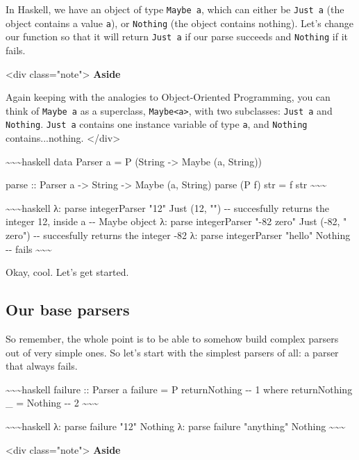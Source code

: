 \documentclass[]{article}
\begin{document}
In Haskell, we have an object of type \texttt{Maybe\ a}, which can either be
\texttt{Just\ a} (the object contains a value \texttt{a}), or \texttt{Nothing}
(the object contains nothing). Let's change our function so that it will return
\texttt{Just\ a} if our parse succeeds and \texttt{Nothing} if it fails.

\textless{}div class="note"\textgreater{} \textbf{Aside}

Again keeping with the analogies to Object-Oriented Programming, you can think
of \texttt{Maybe\ a} as a superclass, \texttt{Maybe\textless{}a\textgreater{}},
with two subclasses: \texttt{Just\ a} and \texttt{Nothing}. \texttt{Just\ a}
contains one instance variable of type \texttt{a}, and \texttt{Nothing}
contains...nothing. \textless{}/div\textgreater{}

\textasciitilde{}\textasciitilde{}\textasciitilde{}haskell data Parser a = P
(String -\textgreater{} Maybe (a, String))

parse :: Parser a -\textgreater{} String -\textgreater{} Maybe (a, String) parse
(P f) str = f str \textasciitilde{}\textasciitilde{}\textasciitilde{}

\textasciitilde{}\textasciitilde{}\textasciitilde{}haskell λ: parse
integerParser "12" Just (12, "") -\/- succesfully returns the integer 12, inside
a -\/- Maybe object λ: parse integerParser "-82 zero" Just (-82, " zero") -\/-
succesfully returns the integer -82 λ: parse integerParser "hello" Nothing -\/-
fails \textasciitilde{}\textasciitilde{}\textasciitilde{}

Okay, cool. Let's get started.

\subsection{Our base parsers}

So remember, the whole point is to be able to somehow build complex parsers out
of very simple ones. So let's start with the simplest parsers of all: a parser
that always fails.

\textasciitilde{}\textasciitilde{}\textasciitilde{}haskell failure :: Parser a
failure = P returnNothing -\/- 1 where returnNothing \_ = Nothing -\/- 2
\textasciitilde{}\textasciitilde{}\textasciitilde{}

\textasciitilde{}\textasciitilde{}\textasciitilde{}haskell λ: parse failure "12"
Nothing λ: parse failure "anything" Nothing
\textasciitilde{}\textasciitilde{}\textasciitilde{}

\textless{}div class="note"\textgreater{} \textbf{Aside}
\end{document}
